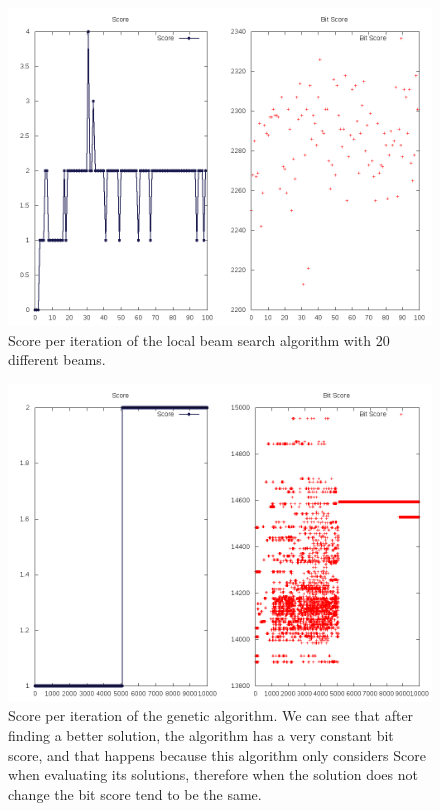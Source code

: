 \documentclass[12pt]{article}
\begin{document}
\begin{figure}[h]
    \centerline{\includegraphics[scale=.5]{LBAnalysis}}
\caption{Score per iteration of the local beam search algorithm with 20 different beams.}
\end{figure}

\begin{figure}[h]
    \centerline{\includegraphics[scale=.5]{GAAnalysis}}
\caption{Score per iteration of the genetic algorithm. We can see that after finding a better solution, the algorithm has a very constant bit score, and that happens because this algorithm only considers Score when evaluating its solutions, therefore when the solution does not change the bit score tend to be the same.}
\end{figure}
\end{document}
